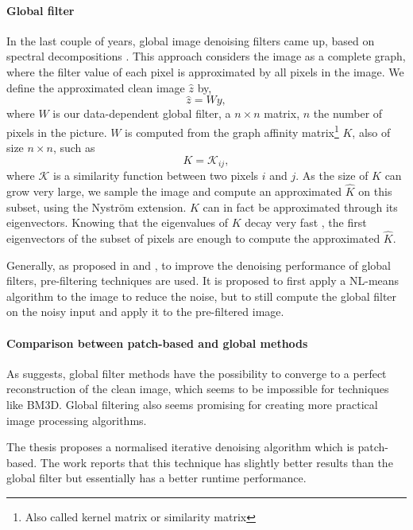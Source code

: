 \paragraph{Global filter}

In the last couple of years, global image denoising filters came up, based on spectral decompositions \cite{glide_2014}.
This approach considers the image as a complete graph, where the filter value of each pixel is approximated by all pixels in the image.
We define the approximated clean image \(\hat{z}\) by,
\[\hat{z} = Wy,\]
where \(W\) is our data-dependent global filter, a \(n \times n\) matrix, \(n\) the number of pixels in the picture.
\(W\) is computed from the graph affinity matrix\footnote{Also called kernel matrix or similarity matrix} \(K\), also of size \(n \times n\), such as
\[K = {\mathcal{K}_{ij}},\]
where \(\mathcal{K}\) is a similarity function between two pixels \(i\) and \(j\).
As the size of \(K\) can grow very large, we sample the image and compute an approximated \(\hat{K}\) on this subset, using the Nystr\"om extension.
\(K\) can in fact be approximated through its eigenvectors.
Knowing that the eigenvalues of \(K\) decay very fast \cite{siam_slides_2016}, the first eigenvectors of the subset of pixels are enough to compute the approximated \(\hat{K}\).

Generally, as proposed in \cite{glide_2014} and \cite{talebi_asymptotic_2016}, to improve the denoising performance of global filters, pre-filtering techniques are used.
It is proposed to first apply a NL-means algorithm to the image to reduce the noise, but to still compute the global filter on the noisy input and apply it to the pre-filtered image.

\paragraph{Comparison between patch-based and global methods}

As \cite{talebi_asymptotic_2016} suggests, global filter methods have the possibility to converge to a perfect reconstruction of the clean image, which seems to be impossible for techniques like BM3D.
Global filtering also seems promising for creating more practical image processing algorithms.

The thesis \cite{kheradmand_graph-based_2016} proposes a normalised iterative denoising algorithm which is patch-based.
The work reports that this technique has slightly better results than the global filter but essentially has a better runtime performance.

